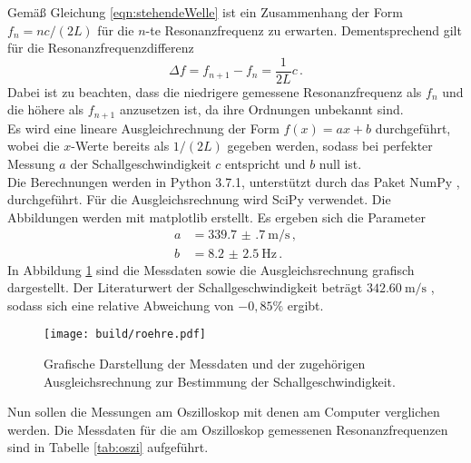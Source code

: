 Gemäß Gleichung \eqref{eqn:stehendeWelle} ist ein Zusammenhang der Form $f_n = nc/(2 L)$
für die $n$-te Resonanzfrequenz zu erwarten. Dementsprechend gilt für die Resonanzfrequenzdifferenz
\begin{equation}
	\Delta f = f_{n+1} - f_n = \frac{1}{2L} c\,.
	\label{eqn:deltaf}
\end{equation}
Dabei ist zu beachten, dass die niedrigere gemessene Resonanzfrequenz als $f_n$ und die höhere als $f_{n+1}$ anzusetzen ist, da ihre Ordnungen unbekannt sind.\\
Es wird eine lineare Ausgleichrechnung der Form $f(x)=ax+b$ durchgeführt, wobei die $x$-Werte bereits als $1/(2L)$ gegeben werden, sodass bei perfekter Messung $a$ der Schallgeschwindigkeit $c$ entspricht und $b$ null ist.\\
Die Berechnungen werden in Python 3.7.1, unterstützt durch das Paket NumPy \cite{numpy}, durchgeführt.
Für die Ausgleichsrechnung wird SciPy \cite{scipy} verwendet. Die Abbildungen werden mit matplotlib \cite{matplotlib} erstellt. Es ergeben sich die Parameter
\begin{align*}
  a&=\SI{339.7(7)}{\meter\per\second}\,, \\
  b&=\SI{8.2(25)}{\Hz}\,.
\end{align*}
In Abbildung \ref{fig:roehre} sind die Messdaten sowie die Ausgleichsrechnung grafisch
dargestellt.
Der Literaturwert der Schallgeschwindigkeit beträgt $\SI{342.60}{\meter\per\second}$ \cite{Schallgeschwindigkeit}, sodass sich eine relative Abweichung von $-0{,}85\%$ ergibt.

\begin{figure}[h!]
  \centering
  \texttt{[image: build/roehre.pdf]}
  \caption{Grafische Darstellung der Messdaten und der zugehörigen Ausgleichsrechnung
  zur Bestimmung der Schallgeschwindigkeit.}
  \label{fig:roehre}
\end{figure}

Nun sollen die Messungen am Oszilloskop mit denen am Computer verglichen werden.
Die Messdaten für die am Oszilloskop gemessenen Resonanzfrequenzen sind in Tabelle \ref{tab:oszi} aufgeführt.

